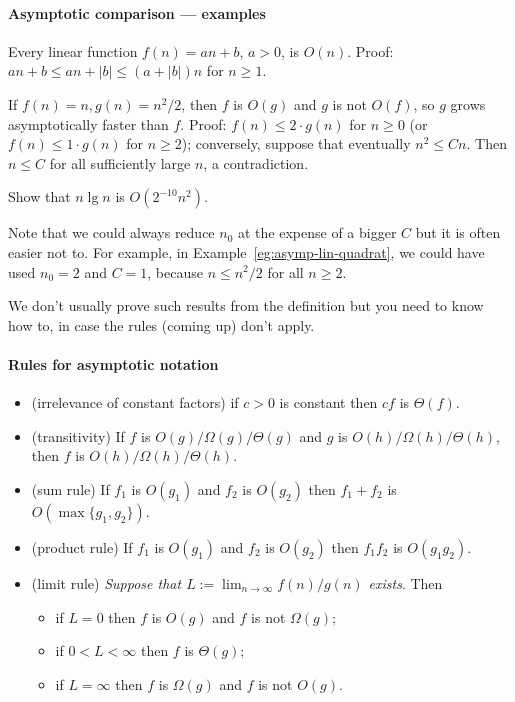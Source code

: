 \paragraph{Asymptotic comparison --- examples}
\begin{Example}
Every linear function $f(n) = an + b$, $a > 0$, is $O(n)$. Proof: 
$an + b \leq an + |b| \leq (a + |b|) n$ for $n \geq 1$. 
\end{Example}

\begin{Example}
\label{eg:asymp-lin-quadrat}
If $f(n) = n, g(n) = n^2/2$, then $f$ is $O(g)$ and $g$ is not
$O(f)$, so $g$ grows asymptotically faster than $f$. Proof: 
$f(n) \leq 2 \cdot g(n)$ for $n\geq 0$ (or $f(n) \leq 1 \cdot g(n)$ for 
$n \geq 2$); conversely, suppose 
that eventually $n^2 \leq Cn$. Then $n \leq C$ for all sufficiently large $n$, 
a contradiction.
\end{Example}

\begin{Boxample}[4]
Show that $n \lg n$ is $O(2^{-10} n^2)$.
\end{Boxample}

Note that we could always reduce $n_0$ at the expense of a bigger $C$ but 
it is often easier not to. For example, in Example~\ref{eg:asymp-lin-quadrat}, we could have used 
$n_0 = 2$ and $C = 1$, because $n\leq n^2/2$ for all $n\geq 2$.

We don't usually prove such results from the definition but you
need to know how to, in case the rules (coming up) don't apply.

\paragraph{Rules for asymptotic notation}
\begin{itemize}
\item (irrelevance of constant factors) if $c > 0$ is constant then $cf$ is $\Theta(f)$.
\item (transitivity) If $f$ is $O(g)/\Omega(g)/\Theta(g)$ and $g$ is 
$O(h)/\Omega(h)/\Theta(h)$, then $f$ is $O(h)/\Omega(h)/\Theta(h)$.
\item (sum rule) If $f_1$ is $O(g_1)$ and $f_2$ is $O(g_2)$ then $f_1 + f_2$ is 
$O(\max\{g_1, g_2\})$.
\item (product rule) If $f_1$ is $O(g_1)$ and $f_2$ is $O(g_2)$ then $f_1 f_2$ 
is $O(g_1 g_2)$.
\item (limit rule) \emph{Suppose that $L:=\lim_{n\to\infty} f(n)/g(n)$ exists}. 
Then
\begin{itemize}
\item if $L = 0$ then $f$ is $O(g)$ and $f$ is not $\Omega(g)$;
\item if $0 < L < \infty$ then $f$ is $\Theta(g)$;
\item if $L = \infty$ then $f$ is $\Omega(g)$ and $f$ is not $O(g)$.
\end{itemize}
\end{itemize}

